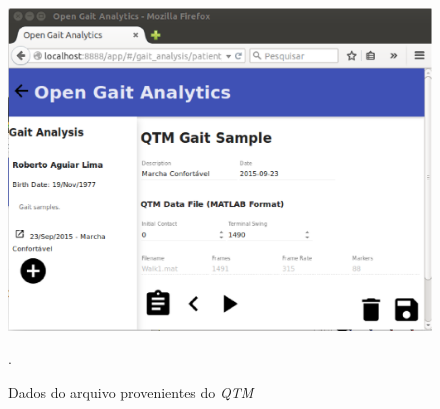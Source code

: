 \begin{figure}[ht]
	\centering
	\includegraphics[width=15cm]{figuras/tela7.eps}
	\caption{Dados do arquivo provenientes do \emph{QTM}}.
	\label{tela7}
\end{figure}



